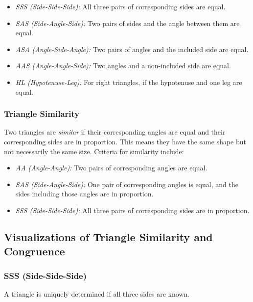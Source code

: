 \begin{itemize}[label=\(-\)]
    \item \emph{SSS (Side-Side-Side):} All three pairs of corresponding sides are equal.
    \item \emph{SAS (Side-Angle-Side):} Two pairs of sides and the angle between them are equal.
    \item \emph{ASA (Angle-Side-Angle):} Two pairs of angles and the included side are equal.
    \item \emph{AAS (Angle-Angle-Side):} Two angles and a non-included side are equal.
    \item \emph{HL (Hypotenuse-Leg):} For right triangles, if the hypotenuse and one leg are equal.
\end{itemize}

\subsubsection{Triangle Similarity}
Two triangles are \emph{similar} if their corresponding angles are equal and their corresponding sides are in proportion. This means they have the same shape but not necessarily the same size. Criteria for similarity include:

\begin{itemize}[label=\(-\)]
    \item \emph{AA (Angle-Angle):} Two pairs of corresponding angles are equal.
    \item \emph{SAS (Side-Angle-Side):} One pair of corresponding angles is equal, and the sides including those angles are in proportion.
    \item \emph{SSS (Side-Side-Side):} All three pairs of corresponding sides are in proportion.
\end{itemize}

\subsection{Visualizations of Triangle Similarity and Congruence}
\subsubsection{SSS (Side-Side-Side)}
A triangle is uniquely determined if all three sides are known.
\begin{center}
\end{center}

